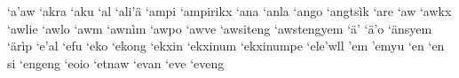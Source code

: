 \documentclass[a4paper]{article}
\begin{document}
\tiny
\noindent
`a'aw\hspace{2mm}
`akra\hspace{2mm}
`aku\hspace{2mm}
`al\hspace{2mm}
`ali'ä\hspace{2mm}
`ampi\hspace{2mm}
`ampirikx\hspace{2mm}
`ana\hspace{2mm}
`anla\hspace{2mm}
`ango\hspace{2mm}
`angtsìk\hspace{2mm}
`are\hspace{2mm}
`aw\hspace{2mm}
`awkx\hspace{2mm}
`awlie\hspace{2mm}
`awlo\hspace{2mm}
`awm\hspace{2mm}
`awnìm\hspace{2mm}
`awpo\hspace{2mm}
`awve\hspace{2mm}
`awsiteng\hspace{2mm}
`awstengyem\hspace{2mm}
`ä'\hspace{2mm}
`ä'o\hspace{2mm}
`änsyem\hspace{2mm}
`ärìp\hspace{2mm}
`e'al\hspace{2mm}
`efu\hspace{2mm}
`eko\hspace{2mm}
`ekong\hspace{2mm}
`ekxin\hspace{2mm}
`ekxinum\hspace{2mm}
`ekxinumpe\hspace{2mm}
`ele'wll\hspace{2mm}
'em\hspace{2mm}
'emyu\hspace{2mm}
`en\hspace{2mm}
`en si\hspace{2mm}
`engeng\hspace{2mm}
`eoio\hspace{2mm}
`etnaw\hspace{2mm}
`evan\hspace{2mm}
`eve\hspace{2mm}
`eveng\hspace{2mm}
\end{document}
